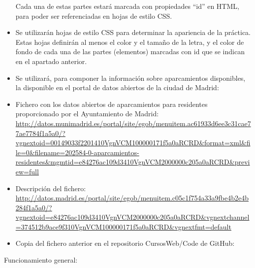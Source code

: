 \begin{itemize}
Cada una de estas partes estará marcada con propiedades ``id'' en HTML, para poder ser referenciadas en hojas de estilo CSS.

\item Se utilizarán hojas de estilo CSS para determinar la apariencia de la práctica. Estas hojas definirán al menos el color y el tamaño de la letra, y el color de fondo de cada una de las partes (elementos) marcadas con id que se indican en el apartado anterior.

\item Se utilizará, para componer la información sobre aparcamientos disponibles, la disponible en el portal de datos abiertos de la ciudad de Madrid:

  \item Fichero con los datos abiertos de aparcamientos para residentes proporcionado por el Ayuntamiento de Madrid: \\
    \url{http://datos.munimadrid.es/portal/site/egob/menuitem.ac61933d6ee3c31cae77ae7784f1a5a0/?vgnextoid=00149033f2201410VgnVCM100000171f5a0aRCRD&format=xml&file=0&filename=202584-0-aparcamientos-residentes&mgmtid=e84276ac109d3410VgnVCM2000000c205a0aRCRD&preview=full}

  \item Descripción del fichero: \\
    \url{http://datos.madrid.es/portal/site/egob/menuitem.c05c1f754a33a9fbe4b2e4b284f1a5a0/?vgnextoid=e84276ac109d3410VgnVCM2000000c205a0aRCRD&vgnextchannel=374512b9ace9f310VgnVCM100000171f5a0aRCRD&vgnextfmt=default}
      
  \item Copia del fichero anterior en el repositorio CursosWeb/Code de GitHub: \\
\end{itemize}

Funcionamiento general:

